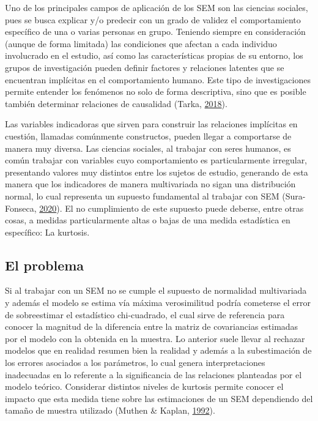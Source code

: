 \documentclass[
]{article}
\begin{document}
Uno de los principales campos de aplicación de los SEM son las ciencias
sociales, pues se busca explicar y/o predecir con un grado de validez el
comportamiento específico de una o varias personas en grupo. Teniendo
siempre en consideración (aunque de forma limitada) las condiciones que
afectan a cada individuo involucrado en el estudio, así como las
características propias de su entorno, los grupos de investigación
pueden definir factores y relaciones latentes que se encuentran
implícitas en el comportamiento humano. Este tipo de investigaciones
permite entender los fenómenos no solo de forma descriptiva, sino que es
posible también determinar relaciones de causalidad (Tarka,
\protect\hyperlink{ref-Tarka}{2018}).

Las variables indicadoras que sirven para construir las relaciones
implícitas en cuestión, llamadas comúnmente constructos, pueden llegar a
comportarse de manera muy diversa. Las ciencias sociales, al trabajar
con seres humanos, es común trabajar con variables cuyo comportamiento
es particularmente irregular, presentando valores muy distintos entre
los sujetos de estudio, generando de esta manera que los indicadores de
manera multivariada no sigan una distribución normal, lo cual representa
un supuesto fundamental al trabajar con SEM (Sura-Fonseca,
\protect\hyperlink{ref-sura}{2020}). El no cumplimiento de este supuesto
puede deberse, entre otras cosas, a medidas particularmente altas o
bajas de una medida estadística en específico: La kurtosis.

\subsection{El problema}

Si al trabajar con un SEM no se cumple el supuesto de normalidad
multivariada y además el modelo se estima vía máxima verosimilitud
podría cometerse el error de sobreestimar el estadístico chi-cuadrado,
el cual sirve de referencia para conocer la magnitud de la diferencia
entre la matriz de covariancias estimadas por el modelo con la obtenida
en la muestra. Lo anterior suele llevar al rechazar modelos que en
realidad resumen bien la realidad y además a la subestimación de los
errores asociados a los parámetros, lo cual genera interpretaciones
inadecuadas en lo referente a la significancia de las relaciones
planteadas por el modelo teórico. Considerar distintos niveles de
kurtosis permite conocer el impacto que esta medida tiene sobre las
estimaciones de un SEM dependiendo del tamaño de muestra utilizado
(Muthen \& Kaplan, \protect\hyperlink{ref-muthen}{1992}).
\end{document}
